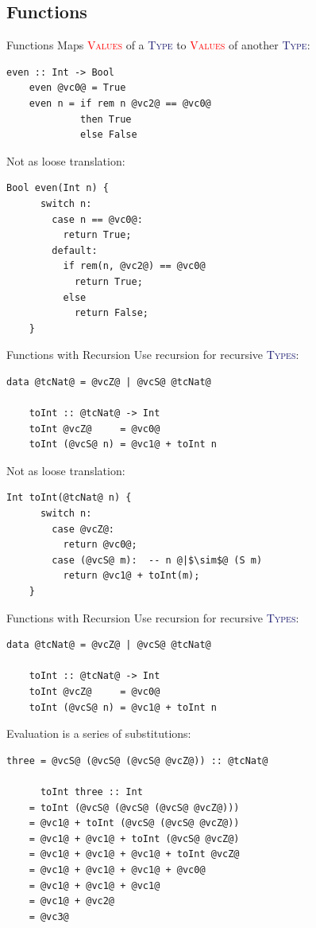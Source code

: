 \documentclass[xcolor={usenames,dvipsnames}]{beamer}
\newcommand{\htycon}[1]{\textcolor{MidnightBlue}{\textsc{#1}}}
\newcommand{\hvalcon}[1]{\textcolor{Red}{\textsc{#1}}}
\begin{document}
\subsection{Functions}

\begin{frame}[fragile]{Functions}
  Maps \hvalcon{Values} of a \htycon{Type} to \hvalcon{Values} of another \htycon{Type}:
  \begin{lstlisting}[style=hask]
    even :: Int -> Bool
    even @vc0@ = True
    even n = if rem n @vc2@ == @vc0@
             then True
             else False
  \end{lstlisting}

  Not as loose translation:
  \begin{lstlisting}[style=hask]
    Bool even(Int n) {
      switch n:
        case n == @vc0@:
          return True;
        default:
          if rem(n, @vc2@) == @vc0@
            return True;
          else
            return False;
    }
  \end{lstlisting}
\end{frame}

\begin{frame}[fragile]{Functions with Recursion}
  Use recursion for recursive \htycon{Types}:
  \begin{lstlisting}[style=hask]
    data @tcNat@ = @vcZ@ | @vcS@ @tcNat@

    toInt :: @tcNat@ -> Int
    toInt @vcZ@     = @vc0@
    toInt (@vcS@ n) = @vc1@ + toInt n
  \end{lstlisting}

  Not as loose translation:
  \begin{lstlisting}[style=hask]
    Int toInt(@tcNat@ n) {
      switch n:
        case @vcZ@:
          return @vc0@;
        case (@vcS@ m):  -- n @|$\sim$@ (S m)
          return @vc1@ + toInt(m);
    }
  \end{lstlisting}
\end{frame}

\begin{frame}[fragile]{Functions with Recursion}
  Use recursion for recursive \htycon{Types}:
  \begin{lstlisting}[style=hask]
    data @tcNat@ = @vcZ@ | @vcS@ @tcNat@

    toInt :: @tcNat@ -> Int
    toInt @vcZ@     = @vc0@
    toInt (@vcS@ n) = @vc1@ + toInt n
  \end{lstlisting}

  Evaluation is a series of substitutions:
  \begin{lstlisting}[style=hask]
    three = @vcS@ (@vcS@ (@vcS@ @vcZ@)) :: @tcNat@

      toInt three :: Int
    = toInt (@vcS@ (@vcS@ (@vcS@ @vcZ@)))
    = @vc1@ + toInt (@vcS@ (@vcS@ @vcZ@))
    = @vc1@ + @vc1@ + toInt (@vcS@ @vcZ@)
    = @vc1@ + @vc1@ + @vc1@ + toInt @vcZ@
    = @vc1@ + @vc1@ + @vc1@ + @vc0@
    = @vc1@ + @vc1@ + @vc1@
    = @vc1@ + @vc2@
    = @vc3@
  \end{lstlisting}
\end{frame}
\end{document}
